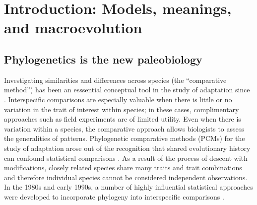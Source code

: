 \chapter{Introduction: Models, meanings, and macroevolution}
\label{chap:introduction}



\section{Phylogenetics is the new paleobiology}

Investigating similarities and differences across species (the ``comparative method'') has been an esssential conceptual tool in the study of adaptation since \citet{Darwin1859}. Interspecific comparisons are especially valuable when there is little or no variation in the trait of interest within species; in these cases, complimentary approaches such as field experiments are of limited utility. Even when there is variation within a species, the comparative approach allows biologists to assess the generalities of patterns. Phylogenetic comparative methods (PCMs) for the study of adaptation arose out of the recognition that shared evolutionary history can confound statistical comparisons \citep{HarveyPagel1991}. As a result of the process of descent with modifications, closely related species share many traits and trait combinations and therefore individual species cannot be considered independent observations. In the 1980s and early 1990s, a number of highly influential statistical approaches were developed to incorporate phylogeny into interspecific comparisons \citep{Ridley1983, Felsenstein1985, Grafen1989, Maddison1990, HarveyPagel1991, Lynch1991, Pagel1994}. 

